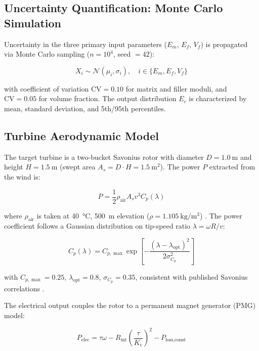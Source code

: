 \documentclass[twocolumn]{article}
\begin{document}
\subsection{Uncertainty Quantification: Monte Carlo Simulation}

Uncertainty in the three primary input parameters ($E_m$, $E_f$, $V_f$) is propagated via Monte Carlo sampling ($n = 10^4$, seed $= 42$):

\begin{equation}
X_i \sim \mathcal{N}(\mu_i, \sigma_i), \quad i \in \{E_m, E_f, V_f\}
\end{equation}

with coefficient of variation $\mathrm{CV} = 0.10$ for matrix and filler moduli, and $\mathrm{CV} = 0.05$ for volume fraction. The output distribution $E_c$ is characterized by mean, standard deviation, and 5th/95th percentiles.

\subsection{Turbine Aerodynamic Model}

The target turbine is a two-bucket Savonius rotor with diameter $D = \SI{1.0}{\meter}$ and height $H = \SI{1.5}{\meter}$ (swept area $A_s = D \cdot H = \SI{1.5}{\square\meter}$). The power $P$ extracted from the wind is:

\begin{equation}
P = \frac{1}{2} \rho_{\text{air}} A_s v^3 C_p(\lambda)
\end{equation}

where $\rho_{\text{air}}$ is taken at \SI{40}{\celsius}, \SI{500}{\meter} elevation ($\rho = \SI{1.105}{\kilogram\per\cubic\meter}$) \cite{sonda2023}. The power coefficient follows a Gaussian distribution on tip-speed ratio $\lambda = \omega R / v$:

\begin{equation}
C_p(\lambda) = C_{p,\max} \exp\left[-\frac{(\lambda - \lambda_{\mathrm{opt}})^2}{2\sigma_{C_p}^2}\right]
\end{equation}

with $C_{p,\max} = 0.25$, $\lambda_{\mathrm{opt}} = 0.8$, $\sigma_{C_p} = 0.35$, consistent with published Savonius correlations \cite{akwa2012,kamoji2008,roy2016}.

The electrical output couples the rotor to a permanent magnet generator (PMG) model:

\begin{equation}
P_{\text{elec}} = \tau \omega - R_{\text{int}} \left(\frac{\tau}{K_e}\right)^2 - P_{\text{loss,const}}
\end{equation}
\end{document}
